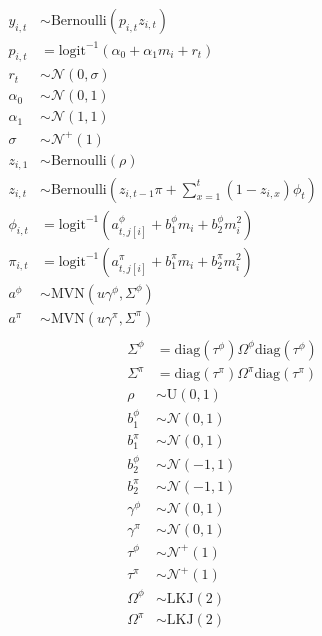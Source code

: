 \documentclass[12pt,letterpaper]{article}
\begin{document}
\begin{equation}
  \begin{aligned}
    \begin{split}
      y_{i, t} &\sim \text{Bernoulli}(p_{i, t} z_{i, t}) \\
      p_{i, t} &= \text{logit}^{-1}(\alpha_{0} + \alpha_{1} m_{i} + r_{t}) \\ 
      r_{t} &\sim \mathcal{N}(0, \sigma) \\
      \alpha_{0} &\sim \mathcal{N}(0, 1) \\
      \alpha_{1} &\sim \mathcal{N}(1, 1) \\
      \sigma &\sim \mathcal{N}^{+}(1) \\
      z_{i, 1} &\sim \text{Bernoulli}(\rho) \\
      z_{i, t} &\sim \text{Bernoulli}\left(z_{i, t - 1} \pi + \sum_{x = 1}^{t}(1 - z_{i, x}) \phi_{t}\right) \\
      \phi_{i, t} &= \text{logit}^{-1}(a^{\phi}_{t, j[i]} + b^{\phi}_{1} m_{i} + b^{\phi}_{2} m_{i}^{2}) \\
      \pi_{i, t} &= \text{logit}^{-1}(a^{\pi}_{t, j[i]} + b^{\pi}_{1} m_{i} + b^{\pi}_{2} m_{i}^{2}) \\
      a^{\phi} &\sim \text{MVN}(u \gamma^{\phi}, \Sigma^{\phi}) \\
      a^{\pi} &\sim \text{MVN}(u \gamma^{\pi}, \Sigma^{\pi}) \\
    \end{split}
    \begin{split}
      \Sigma^{\phi} &= \text{diag}(\tau^{\phi}) \Omega^{\phi} \text{diag}(\tau^{\phi}) \\
      \Sigma^{\pi} &= \text{diag}(\tau^{\pi}) \Omega^{\pi} \text{diag}(\tau^{\pi}) \\
      \rho &\sim \text{U}(0, 1) \\
      b^{\phi}_{1} &\sim \mathcal{N}(0, 1) \\
      b^{\pi}_{1} &\sim \mathcal{N}(0, 1) \\
      b^{\phi}_{2} &\sim \mathcal{N}(-1, 1) \\
      b^{\pi}_{2} &\sim \mathcal{N}(-1, 1) \\
      \gamma^{\phi} &\sim \mathcal{N}(0, 1) \\
      \gamma^{\pi} &\sim \mathcal{N}(0, 1) \\
      \tau^{\phi} &\sim \mathcal{N}^{+}(1) \\
      \tau^{\pi} &\sim \mathcal{N}^{+}(1) \\
      \Omega^{\phi} &\sim \text{LKJ}(2) \\
      \Omega^{\pi} &\sim \text{LKJ}(2) \\
    \end{split}
  \end{aligned}
  \label{eq:birth_death}
\end{equation}
\end{document}
